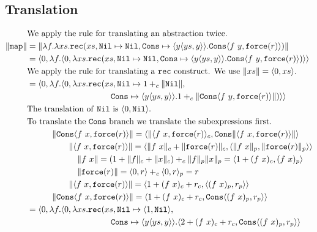 \subsection{Translation}
%
\begin{align*}
  &\text{We apply the rule for translating an abstraction twice.}\\
  \|\texttt{map}\| &= \|\lambda f. \lambda xs . \texttt{rec}(xs, \texttt{Nil} \mapsto \texttt{Nil}, \texttt{Cons} \mapsto \langle y \langle ys, y \rangle\rangle. \texttt{Cons}\langle f\ y, \texttt{force}(r)\rangle)\| \\
              &= \langle 0, \lambda f. \langle 0, \lambda xs . \texttt{rec}(xs, \texttt{Nil} \mapsto \texttt{Nil}, \texttt{Cons} \mapsto \langle y \langle ys, y \rangle\rangle. \texttt{Cons}\langle f\ y, \texttt{force}(r)\rangle)\rangle\rangle \\
              &\text{We apply the rule for translating a \texttt{rec} construct. We use $\|xs\| = \langle 0,xs\rangle$.}\\
              &= \langle 0, \lambda f. \langle 0, \lambda xs .\texttt{rec}(xs, \texttt{Nil} \mapsto 1 +_c \|\texttt{Nil}\|, \\
              &\qquad\quad\quad\quad\qquad\quad\quad\quad \texttt{Cons} \mapsto \langle y \langle ys, y \rangle\rangle.1 +_c \|\texttt{Cons}\langle f\ y, \texttt{force}(r)\rangle\|)\rangle\rangle \\
              &\text{The translation of \texttt{Nil} is $\langle 0, \texttt{Nil}\rangle$.}\\
              &\text{To translate the \texttt{Cons} branch we translate the subexpressions first.}\\
              &\qquad\quad\|\texttt{Cons}\langle f\ x,\texttt{force}(r)\rangle\| = \langle \|\langle f\ x,\texttt{force}(r)\rangle_c, \texttt{Cons}\|\langle f\ x,\texttt{force}(r)\rangle\|\rangle \\
              &\qquad\quad\quad\quad \|\langle f\ x,\texttt{force}(r)\rangle\| = \langle\|f\ x\|_c + \|\texttt{force}(r)\|_c, \langle \|f\ x\|_p,\|\texttt{force}(r)\|_p\rangle\rangle \\
              &\qquad\quad\quad\quad\quad \|f\ x\| = (1 + \|f\|_c + \|x\|_c) +_c \|f\|_p\|x\|_p = \langle 1 + (f\ x)_c, (f\ x)_p\rangle \\
              &\qquad\quad\quad\quad\quad \|\texttt{force}(r)\| = \langle 0,r\rangle +_c \langle 0,r\rangle_p = r \\
              &\qquad\quad\quad\quad \|\langle f\ x,\texttt{force}(r)\rangle\| = \langle 1 + (f\ x)_c + r_c, \langle (f\ x)_p,r_p\rangle\rangle \\
              &\qquad\quad \|\texttt{Cons}\langle f\ x,\texttt{force}(r)\rangle\| = \langle 1 + (f\ x)_c + r_c, \texttt{Cons}\langle (f\ x)_p,r_p\rangle\rangle \\
              &= \langle 0, \lambda f. \langle 0, \lambda xs . \texttt{rec}(xs, \texttt{Nil} \mapsto \langle 1,\texttt{Nil}\rangle, \\
              &\qquad\quad\quad\quad\qquad\quad\quad\quad \texttt{Cons} \mapsto \langle y \langle ys, y \rangle\rangle.\langle 2 + (f\ x)_c + r_c, \texttt{Cons}\langle (f\ x)_p,r_p\rangle\rangle \\
\end{align*}
